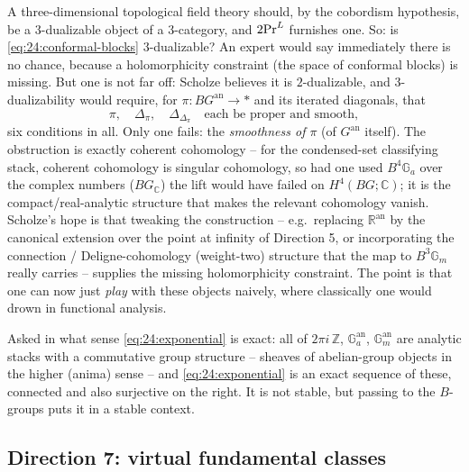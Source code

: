 \begin{remark}[Is it $3$-dualizable?]
\label{rmk:24:dualizable}
A three-dimensional topological field theory should, by the cobordism
hypothesis, be a $3$-dualizable object of a $3$-category, and $2\mathrm{Pr}^{L}$ furnishes
one. So: is \eqref{eq:24:conformal-blocks} $3$-dualizable? An expert would say
immediately there is no chance, because a holomorphicity constraint (the space of
conformal blocks) is missing. But one is not far off: Scholze believes it is
$2$-dualizable, and $3$-dualizability would require, for
$\pi\colon BG^{\mathrm{an}}\to\ast$ and its iterated diagonals, that
\begin{equation*}
\pi,\quad \Delta_\pi,\quad \Delta_{\Delta_\pi}
\quad\text{each be proper and smooth} ,
\end{equation*}
six conditions in all. Only one fails: the \emph{smoothness of $\pi$} (of
$G^{\mathrm{an}}$ itself). The obstruction is exactly coherent cohomology -- for
the condensed-set classifying stack, coherent cohomology is singular cohomology,
so had one used $B^4\mathbb G_a$ over the complex numbers ($BG_{\mathbb C}$) the
lift would have failed on $H^4(BG;\mathbb C)$; it is the compact/real-analytic
structure that makes the relevant cohomology vanish. Scholze's hope is that
tweaking the construction -- e.g.\ replacing $\mathbb R^{\mathrm{an}}$ by the
canonical extension over the point at infinity of Direction 5, or incorporating
the connection / Deligne-cohomology (weight-two) structure that the map to
$B^3\mathbb G_m$ really carries -- supplies the missing holomorphicity
constraint. The point is that one can now just \emph{play} with these objects
naively, where classically one would drown in functional analysis.
\end{remark}

\begin{remark}
\label{rmk:24:exponential-stacks}
Asked in what sense \eqref{eq:24:exponential} is exact: all of $2\pi i\,\mathbb Z$,
$\mathbb G_a^{\mathrm{an}}$, $\mathbb G_m^{\mathrm{an}}$ are analytic stacks with a
commutative group structure -- sheaves of abelian-group objects in the higher
(anima) sense -- and \eqref{eq:24:exponential} is an exact sequence of these,
connected and also surjective on the right. It is not stable, but passing to the
$B$-groups puts it in a stable context.
\end{remark}

\subsection{Direction 7: virtual fundamental classes}
\label{subsec:24:vfc}

